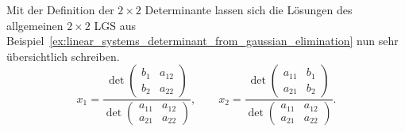\begin{samepage}
Mit der Definition der $2\times2$ Determinante lassen sich die Lösungen des allgemeinen
$2\times2$ LGS aus Beispiel~\ref{ex:linear_systems_determinant_from_gaussian_elimination}
nun sehr übersichtlich schreiben.
\[
  x_1=
  \frac{
    \det\!\begin{pmatrix}b_1&a_{12}\\b_2&a_{22}\end{pmatrix}
  }{
    \det\!\begin{pmatrix}a_{11}&a_{12}\\a_{21}&a_{22}\end{pmatrix}
  },
  \qquad
  x_2=
  \frac{
    \det\!\begin{pmatrix}a_{11}&b_1\\a_{21}&b_2\end{pmatrix}
  }{
    \det\!\begin{pmatrix}a_{11}&a_{12}\\a_{21}&a_{22}\end{pmatrix}
  }.
\]
\end{samepage}
